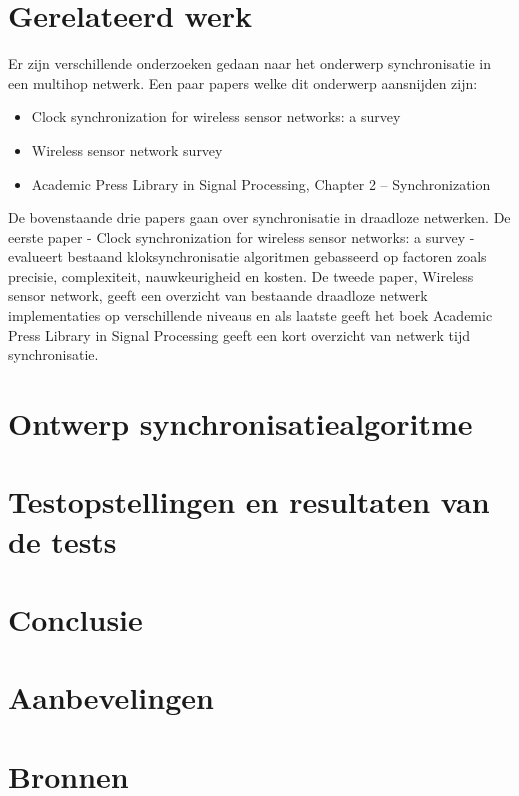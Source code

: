 \documentclass{article}
\begin{document}
\section{Gerelateerd werk}
Er zijn verschillende onderzoeken gedaan naar het onderwerp synchronisatie in een multihop netwerk. 
Een paar papers welke dit onderwerp aansnijden zijn: 
\begin{itemize}
	\item Clock synchronization for wireless sensor networks: a survey
	\item Wireless sensor network survey
	\item Academic Press Library in Signal Processing, Chapter 2 – Synchronization
\end{itemize}
De bovenstaande drie papers gaan over synchronisatie in draadloze netwerken. De eerste paper - Clock synchronization for wireless sensor networks: a survey - evalueert bestaand kloksynchronisatie algoritmen gebasseerd op factoren zoals precisie, complexiteit, nauwkeurigheid en kosten. De tweede paper, Wireless sensor network, geeft een overzicht van bestaande draadloze netwerk implementaties op verschillende niveaus en als laatste geeft het boek Academic Press Library in Signal Processing geeft een kort overzicht van netwerk tijd synchronisatie. 

\section{Ontwerp synchronisatiealgoritme}
\section{Testopstellingen en resultaten van de tests}
\section{Conclusie}
\section{Aanbevelingen}
\section{Bronnen}
\end{document}
